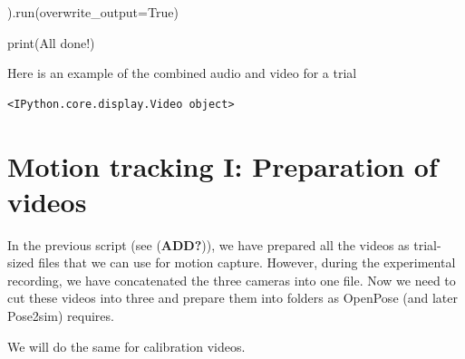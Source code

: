 \documentclass[
  letterpaper,
  DIV=11,
  numbers=noendperiod]{scrreprt}
\newenvironment{Shaded}{\begin{snugshade}}{\end{snugshade}}
\newcommand{\BuiltInTok}[1]{\textcolor[rgb]{0.00,0.23,0.31}{#1}}
\newcommand{\NormalTok}[1]{\textcolor[rgb]{0.00,0.23,0.31}{#1}}
\newcommand{\OperatorTok}[1]{\textcolor[rgb]{0.37,0.37,0.37}{#1}}
\newcommand{\StringTok}[1]{\textcolor[rgb]{0.13,0.47,0.30}{#1}}
\newcommand{\VariableTok}[1]{\textcolor[rgb]{0.07,0.07,0.07}{#1}}
\begin{document}
\begin{Shaded}
\begin{Highlighting}[]
\NormalTok{        ).run(overwrite\_output}\OperatorTok{=}\VariableTok{True}\NormalTok{)}
    
\BuiltInTok{print}\NormalTok{(}\StringTok{\textquotesingle{}All done!\textquotesingle{}}\NormalTok{)}
\end{Highlighting}
\end{Shaded}

Here is an example of the combined audio and video for a trial

\begin{verbatim}
<IPython.core.display.Video object>
\end{verbatim}


\chapter{Motion tracking I: Preparation of
videos}\label{motion-tracking-i-preparation-of-videos}

In the previous script (see (\textbf{ADD?})), we have prepared all the
videos as trial-sized files that we can use for motion capture. However,
during the experimental recording, we have concatenated the three
cameras into one file. Now we need to cut these videos into three and
prepare them into folders as OpenPose (and later Pose2sim) requires.

We will do the same for calibration videos.
\end{document}
